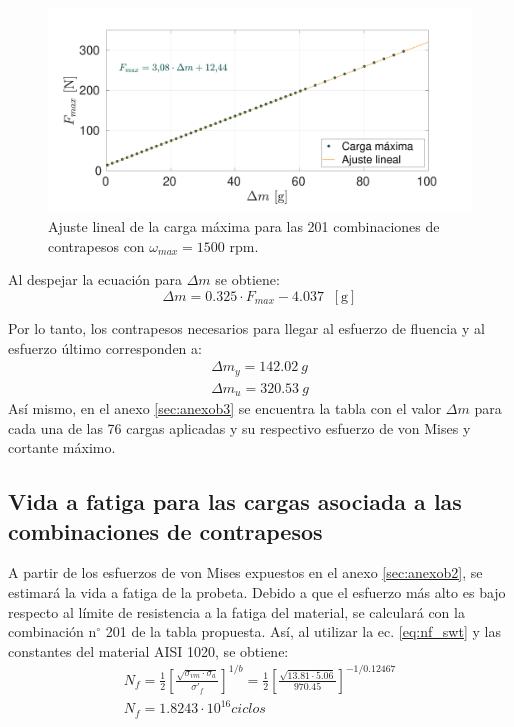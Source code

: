 \begin{figure}[h]
\centering
\includegraphics[width=1\linewidth, trim={1cm 0cm 2cm 0cm}, clip]{Imagenes/fmax_dmec.pdf}
\caption{Ajuste lineal de la carga máxima para las 201 combinaciones de contrapesos con $\omega_{max}=1500$ rpm.}
\label{fig:fmax_dmec}
\end{figure}
Al despejar la ecuación para $\Delta m$ se obtiene: 
\begin{equation}\label{eq:deltam}
	\Delta m = 0.325\cdot F_{max} - 4.037 \;\; [\text{g}]
\end{equation}

Por lo tanto, los contrapesos necesarios para llegar al esfuerzo de fluencia y al esfuerzo último corresponden a:
\begin{gather*}
	\Delta m_y = 142.02 \: g \\
	\Delta m_u = 320.53 \: g
\end{gather*}
Así mismo, en el anexo \ref{sec:anexob3} se encuentra la tabla con el valor $\Delta m$ para cada una de las 76 cargas aplicadas y su respectivo esfuerzo de von Mises y cortante máximo.

\subsection{Vida a fatiga para las cargas asociada a las combinaciones de contrapesos}

A partir de los esfuerzos de von Mises expuestos en el anexo \ref{sec:anexob2}, se estimará la vida a fatiga de la probeta. Debido a que el esfuerzo más alto es bajo respecto al límite de resistencia a la fatiga del material, se calculará con la combinación n$^{\circ}$ 201 de la tabla propuesta. Así, al utilizar la ec. \ref{eq:nf_swt} y las constantes del material AISI 1020, se obtiene:
\begin{gather*}
	N_f = \frac{1}{2} \left[\frac{\sqrt{\sigma_{vm}\cdot \sigma_a}}{\sigma'_f} \right]^{1/b} = \frac{1}{2} \left[\frac{\sqrt{13.81\cdot 5.06}}{970.45} \right]^{-1/0.12467} \\
	N_f = 1.8243 \cdot 10^{16} ciclos
\end{gather*}

